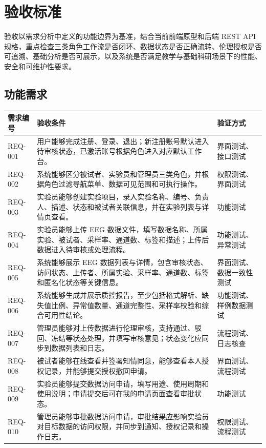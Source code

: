 \section{验收标准}

验收以需求分析中定义的功能边界为基准，结合当前前端原型和后端 REST API 规格，重点检查三类角色工作流是否闭环、数据状态是否正确流转、伦理授权是否可追溯、基础分析是否可展示，以及系统是否满足教学与基础科研场景下的性能、安全和可维护性要求。

\subsection{功能需求}

\begin{longtable}{|p{24mm}|p{88mm}|p{34mm}|}
\hline
\textbf{需求编号} & \textbf{验收条件} & \textbf{验证方式} \\
\hline
REQ-001 & 用户能够完成注册、登录、退出；新注册账号默认进入待审核状态，已激活账号根据角色进入对应默认工作台。 & 界面测试、接口测试 \\
\hline
REQ-002 & 系统能够区分被试者、实验员和管理员三类角色，并根据角色过滤导航菜单、数据可见范围和可执行操作。 & 权限测试、界面测试 \\
\hline
REQ-003 & 实验员能够创建实验项目，录入实验名称、编号、负责人、描述、状态和被试者关联信息，并在实验列表与详情页查看。 & 功能测试 \\
\hline
REQ-004 & 实验员能够上传 EEG 数据文件，填写数据名称、所属实验、被试者、采样率、通道数、标签和描述；上传后数据进入待审核或处理流程。 & 功能测试、异常测试 \\
\hline
REQ-005 & 系统能够展示 EEG 数据列表与详情，包含审核状态、访问状态、上传者、所属实验、采样率、通道数、标签和匿名化状态等关键信息。 & 界面测试、数据一致性测试 \\
\hline
REQ-006 & 系统能够生成并展示质控报告，至少包括格式解析、缺失值比例、异常值数量、通道完整性、采样率校验和综合可用性结论。 & 功能测试、样例数据测试 \\
\hline
REQ-007 & 管理员能够对上传数据进行伦理审核，支持通过、驳回、冻结等状态处理，并填写审核意见；状态变化应同步到数据列表和日志。 & 流程测试、日志核查 \\
\hline
REQ-008 & 被试者能够在线查看并签署知情同意，能够查看本人授权记录，并能够提交授权撤回申请。 & 界面测试、流程测试 \\
\hline
REQ-009 & 实验员能够提交数据访问申请，填写用途、使用周期和使用说明；申请提交后可在我的申请页面查看审批状态。 & 功能测试 \\
\hline
REQ-010 & 管理员能够审批数据访问申请，审批结果应影响实验员对目标数据的访问权限，并同步到通知、授权记录和操作日志。 & 权限测试、流程测试 \\

\end{longtable}
